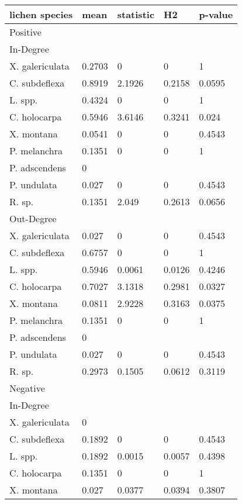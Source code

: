 \begin{table}[ht]
\centering
\begin{tabular}{lllll}
  \hline
lichen species & mean & statistic & H2 & p-value \\ 
  \hline
Positive &  &  &  &  \\ 
  In-Degree &  &  &  &  \\ 
  X. galericulata & 0.2703 & 0 & 0 & 1 \\ 
  C. subdeflexa & 0.8919 & 2.1926 & 0.2158 & 0.0595 \\ 
  L. spp. & 0.4324 & 0 & 0 & 1 \\ 
  C. holocarpa & 0.5946 & 3.6146 & 0.3241 & 0.024 \\ 
  X. montana & 0.0541 & 0 & 0 & 0.4543 \\ 
  P. melanchra & 0.1351 & 0 & 0 & 1 \\ 
  P. adscendens & 0 &  &  &  \\ 
  P. undulata & 0.027 & 0 & 0 & 0.4543 \\ 
  R. sp. & 0.1351 & 2.049 & 0.2613 & 0.0656 \\ 
  Out-Degree &  &  &  &  \\ 
  X. galericulata & 0.027 & 0 & 0 & 0.4543 \\ 
  C. subdeflexa & 0.6757 & 0 & 0 & 1 \\ 
  L. spp. & 0.5946 & 0.0061 & 0.0126 & 0.4246 \\ 
  C. holocarpa & 0.7027 & 3.1318 & 0.2981 & 0.0327 \\ 
  X. montana & 0.0811 & 2.9228 & 0.3163 & 0.0375 \\ 
  P. melanchra & 0.1351 & 0 & 0 & 1 \\ 
  P. adscendens & 0 &  &  &  \\ 
  P. undulata & 0.027 & 0 & 0 & 0.4543 \\ 
  R. sp. & 0.2973 & 0.1505 & 0.0612 & 0.3119 \\ 
  Negative &  &  &  &  \\ 
  In-Degree &  &  &  &  \\ 
  X. galericulata & 0 &  &  &  \\ 
  C. subdeflexa & 0.1892 & 0 & 0 & 0.4543 \\ 
  L. spp. & 0.1892 & 0.0015 & 0.0057 & 0.4398 \\ 
  C. holocarpa & 0.1351 & 0 & 0 & 1 \\ 
  X. montana & 0.027 & 0.0377 & 0.0394 & 0.3807 \\ 

\end{tabular}
\end{table}
